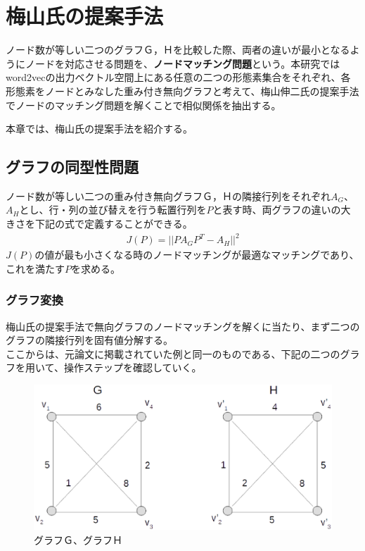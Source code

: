 \chapter{梅山氏の提案手法}
\label{s_ts}
ノード数が等しい二つのグラフＧ，Ｈを比較した際、両者の違いが最小となるようにノードを対応させる問題を、\textbf{ノードマッチング問題}という。本研究ではword2vecの出力ベクトル空間上にある任意の二つの形態素集合をそれぞれ、各形態素をノードとみなした重み付き無向グラフと考えて、梅山伸二氏の提案手法\cite{s_umeyama}でノードのマッチング問題を解くことで相似関係を抽出する。

本章では、梅山氏の提案手法を紹介する。\cite{s_umeyama}

\section{グラフの同型性問題}
ノード数が等しい二つの重み付き無向グラフＧ，Ｈの隣接行列をそれぞれ$A_G$、$A_H$とし、行・列の並び替えを行う転置行列を$P$と表す時、両グラフの違いの大きさを下記の式で定義することができる。
\begin{eqnarray}
  \label{jp_p2}
  J(P)=||PA_GP^T-A_H||^2
\end{eqnarray}
$J(P)$の値が最も小さくなる時のノードマッチングが最適なマッチングであり、これを満たす$P$を求める。

\newpage

\subsection{グラフ変換}
梅山氏の提案手法で無向グラフのノードマッチングを解くに当たり、まず二つのグラフの隣接行列を固有値分解する。\\
ここからは、元論文に掲載されていた例と同一のものである、下記の二つのグラフを用いて、操作ステップを確認していく。
\begin{figure}[h]
  \centering
  \includegraphics[width=12.5cm]{../images/gh.eps}
  \caption{グラフＧ、グラフＨ}
\end{figure}

